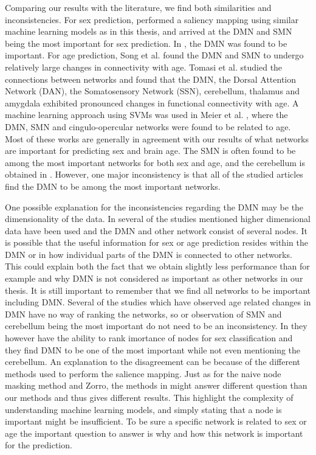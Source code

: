 Comparing our results with the literature, we find both similarities and inconsistencies. For sex prediction, \cite{understanding_gnn} performed a saliency mapping using similar machine learning models as in this thesis, and arrived at the DMN and SMN being the most important for sex prediction. In \cite{arslan}, the DMN was found to be important. For age prediction, Song et al. \cite{song_reorganizational} found the DMN and SMN to undergo relatively large changes in connectivity with age. Tomasi et al. \cite{tomasi_aging} studied the connections between networks and found that the DMN, the Dorsal Attention Network (DAN), the Somatosensory Network (SSN), cerebellum, thalamus and amygdala exhibited pronounced changes in functional connectivity with age. A machine learning approach using SVMs was used in Meier et al. \cite{meier_svm}, where the DMN, SMN and cingulo-opercular networks were found to be related to age. Most of these works are generally in agreement with our results of what networks are important for predicting sex and brain age. The SMN is often found to be among the most important networks for both sex and age, and the cerebellum is obtained in \cite{tomasi_aging}. However, one major inconsistency is that all of the studied articles find the DMN to be among the most important networks. 

One possible explanation for the inconsistencies regarding the DMN may be the dimensionality of the data. In several of the studies mentioned higher dimensional data have been used and the DMN and other network consist of several nodes. It is possible that the useful information for sex or age prediction resides within the DMN or in how individual parts of the DMN is connected to other networks. This could explain both the fact that we obtain slightly less performance than for example \cite{arslan, understanding_gnn} and why DMN is not considered as important as other networks in our thesis. It is still important to remember that we find all networks to be important including DMN. Several of the studies which have observed age related changes in DMN \cite{meier_svm, song_reorganizational, tomasi_aging} have no way of ranking the networks, so or observation of SMN and cerebellum being the most important do not need to be an inconsistency. In \cite{arslan, understanding_gnn} they however have the ability to rank imortance of nodes for sex classification and they find DMN to be one of the most important while not even  mentioning the cerebellum. An explanation to the disagreement can be because of the different methods used to perform the salience mapping. Just as for the naive node masking method and Zorro, the methods in \cite{understanding_gnn, arslan} might answer different question than our methods and thus gives different results. This highlight the complexity of understanding machine learning models, and simply stating that a node is important might be insufficient. To be sure a specific network is related to sex or age the important question to answer is why and how this network is important for the prediction. 


